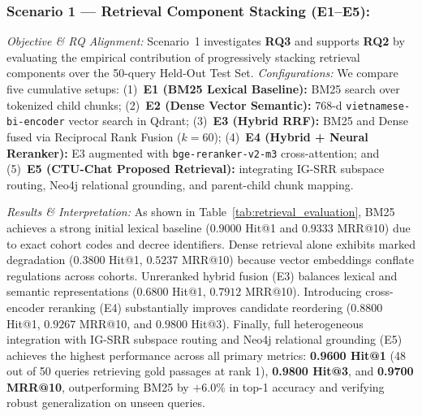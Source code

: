 \subsubsection{Scenario 1 --- Retrieval Component Stacking (E1--E5):}
\emph{Objective \& RQ Alignment:} Scenario~1 investigates \textbf{RQ3} and supports \textbf{RQ2} by evaluating the empirical contribution of progressively stacking retrieval components over the 50-query Held-Out Test Set.
\emph{Configurations:} We compare five cumulative setups: (1)~\textbf{E1 (BM25 Lexical Baseline):} BM25 search over tokenized child chunks; (2)~\textbf{E2 (Dense Vector Semantic):} 768-d \texttt{vietnamese-bi-encoder} vector search in Qdrant; (3)~\textbf{E3 (Hybrid RRF):} BM25 and Dense fused via Reciprocal Rank Fusion ($k=60$); (4)~\textbf{E4 (Hybrid + Neural Reranker):} E3 augmented with \texttt{bge-reranker-v2-m3} cross-attention; and (5)~\textbf{E5 (CTU-Chat Proposed Retrieval):} integrating IG-SRR subspace routing, Neo4j relational grounding, and parent-child chunk mapping.

\emph{Results \& Interpretation:} As shown in Table~\ref{tab:retrieval_evaluation}, BM25 achieves a strong initial lexical baseline ($0.9000$ Hit@1 and $0.9333$ MRR@10) due to exact cohort codes and decree identifiers. Dense retrieval alone exhibits marked degradation ($0.3800$ Hit@1, $0.5237$ MRR@10) because vector embeddings conflate regulations across cohorts. Unreranked hybrid fusion (E3) balances lexical and semantic representations ($0.6800$ Hit@1, $0.7912$ MRR@10). Introducing cross-encoder reranking (E4) substantially improves candidate reordering ($0.8800$ Hit@1, $0.9267$ MRR@10, and $0.9800$ Hit@3). Finally, full heterogeneous integration with IG-SRR subspace routing and Neo4j relational grounding (E5) achieves the highest performance across all primary metrics: \textbf{0.9600 Hit@1} (48 out of 50 queries retrieving gold passages at rank 1), \textbf{0.9800 Hit@3}, and \textbf{0.9700 MRR@10}, outperforming BM25 by $+6.0\%$ in top-1 accuracy and verifying robust generalization on unseen queries.

